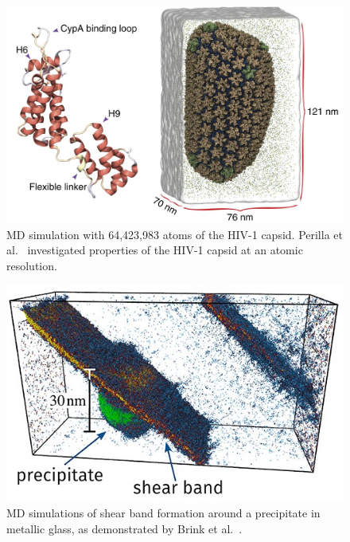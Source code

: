 \begin{multicols*}{2}
    \begin{figure}[H]
        \centering
        \includegraphics[width=0.9\columnwidth, trim={0cm 0 0cm 0cm}]{figures/Intro/HIV-1.png}
        \caption[MD simulation of the HIV-1 capsid]{MD simulation with 64,423,983 atoms of the HIV-1 capsid. Perilla et al.~\cite{Perilla2017} investigated properties of the HIV-1 capsid at an atomic resolution.}
        \label{fig:hiv_capsid}
    \end{figure}

    \begin{figure}[H]
        \centering
        \includegraphics[width=0.9\columnwidth,trim={0cm 0 0cm 0cm}]{figures/Intro/metallic-glass-crack.jpg}
        \caption[MD simulation of shear band formation around a precipitate in metallic glass]{MD simulations of shear band formation around a precipitate in metallic glass, as demonstrated by Brink et al.~\cite{Brink2016}.}
        \label{fig:md_simulation_loop}
    \end{figure}
\end{multicols*}

